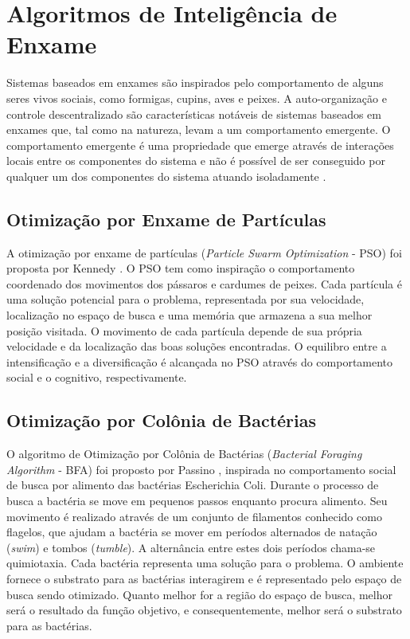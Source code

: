 \section{Algoritmos de Inteligência de Enxame}
\label{sec:swarm_intelligence_algorithms}
Sistemas baseados em enxames são inspirados pelo comportamento de alguns seres vivos sociais, como formigas, cupins, aves e peixes. A auto-organização e controle descentralizado são características notáveis de sistemas baseados em enxames que, tal como na natureza, levam a um comportamento emergente. O comportamento emergente é uma propriedade que emerge através de interações locais entre os componentes do sistema e não é possível de ser conseguido por qualquer um dos componentes do sistema atuando isoladamente \cite{garnier2007biological}.

\subsection{Otimização por Enxame de Partículas}
\label{sec:particle_swarm_optimization}
A otimização por enxame de partículas (\textit{Particle Swarm Optimization} - PSO) foi proposta por Kennedy \cite{pso}. O PSO tem como inspiração o comportamento coordenado dos movimentos dos pássaros e cardumes de peixes. Cada partícula é uma solução potencial para o problema, representada por sua velocidade, localização no espaço de busca e uma memória que armazena a sua melhor posição visitada. O movimento de cada partícula depende de sua própria velocidade e da localização das boas soluções encontradas. O equilibro entre a intensificação e a diversificação é alcançada no PSO através do comportamento social e o cognitivo, respectivamente.

\subsection{Otimização por Colônia de Bactérias}
\label{sec:biomimicry_bacterial_foraging}
O algoritmo de Otimização por Colônia de Bactérias (\textit{Bacterial Foraging Algorithm} - BFA) foi proposto por Passino \cite{passino2002biomimicry}, inspirada no comportamento social de busca por alimento das bactérias Escherichia Coli. Durante o processo de busca a bactéria se move em pequenos passos enquanto procura alimento. Seu movimento é realizado através de um conjunto de filamentos conhecido como flagelos, que ajudam a bactéria se mover em períodos alternados de natação (\textit{swim}) e tombos (\textit{tumble}). A alternância entre estes dois períodos chama-se quimiotaxia. Cada bactéria representa uma solução para o problema. O ambiente fornece o substrato para as bactérias interagirem e é representado pelo espaço de busca sendo otimizado. Quanto melhor for a região do espaço de busca, melhor será o resultado da função objetivo, e consequentemente, melhor será o substrato para as bactérias.

